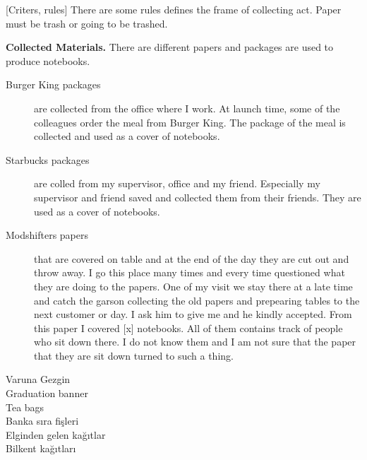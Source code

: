 






[Criters, rules] There are some rules defines the frame of collecting act. Paper must be trash or going to be trashed. 

\textbf{Collected Materials.} There are different papers and packages are used to produce notebooks. 


\begin{description}
  \item[Burger King packages] are collected from the office where I work. At launch time, some of the colleagues order the meal from Burger King. The package of the meal is collected and used as a cover of notebooks.
  \item[Starbucks packages] are colled from my supervisor, office and my friend. Especially my supervisor and friend saved and collected them from their friends. They are used as a cover of notebooks.
  \item[Modshifters papers] that are covered on table and at the end of the day they are cut out and throw away. I go this place many times and every time questioned what they are doing to the papers. One of my visit we stay there at a late time and catch the garson collecting the old papers and prepearing tables to the next customer or day. I ask him to give me and he kindly accepted. From this paper I covered [x] notebooks. All of them contains track of people who sit down there. I do not know them and I am not sure that the paper that they are sit down turned to such a thing. 
  \item[Varuna Gezgin]
  \item[Graduation banner]
  \item[Tea bags]
  \item[Banka sıra fişleri]
  \item[Elginden gelen kağıtlar]
  \item[Bilkent kağıtları]
\end{description}

